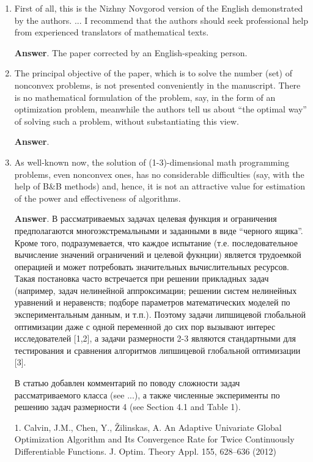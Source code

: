 \documentclass{article}%
\begin{document}
\begin{enumerate}
\item
First of all, this is the Nizhny Novgorod version of the English demonstrated by the authors. ... I recommend that the authors should seek professional help from experienced translators of mathematical texts.

\textbf{Answer}.
The paper corrected by an English-speaking person.

\item The principal objective of the paper, which is to solve the number (set) of nonconvex problems, is not presented conveniently in the manuscript. There is no mathematical formulation of the problem, say, in the form of an optimization problem, meanwhile the authors tell us about “the optimal way” of solving such a problem, without substantiating this view.

\textbf{Answer}.

\item As well-known now, the solution of (1-3)-dimensional math programming problems, even nonconvex ones, has no considerable difficulties (say, with the help of B\&B methods) and, hence, it is not an attractive value for estimation of the power and effectiveness of algorithms.

\textbf{Answer}.
В рассматриваемых задачах целевая функция и ограничения предполагаются многоэкстремальными и заданными в виде ``черного ящика''. Кроме того, подразумевается, что каждое испытание (т.е. последовательное вычисление значений ограничений и целевой фукнции) является трудоемкой операцией и может потребовать значительных вычислительных ресурсов. Такая постановка часто встречается при решении прикладных задач (например, задач нелинейной аппроксимации; решении систем нелинейных уравнений и неравенств; подборе параметров математических моделей по экспериментальным данным, и т.п.). Поэтому задачи липшицевой глобальной оптимизации даже с одной переменной до сих пор вызывают интерес исследователей [1,2], а задачи размерности 2-3 являются стандартными для тестирования и сравнения алгоритмов липшицевой глобальной оптимизации [3].

В статью добавлен комментарий по поводу сложности задач рассматриваемого класса (see ...), а также численные эксперименты
по решению задач размерности 4 (see Section 4.1 and Table 1).

1. Calvin, J.M., Chen, Y., {\v Z}ilinskas, A. An Adaptive Univariate Global Optimization Algorithm and Its Convergence Rate for Twice Continuously Differentiable Functions. J. Optim. Theory Appl. 155, 628–636 (2012)


\end{enumerate}
\end{document}
